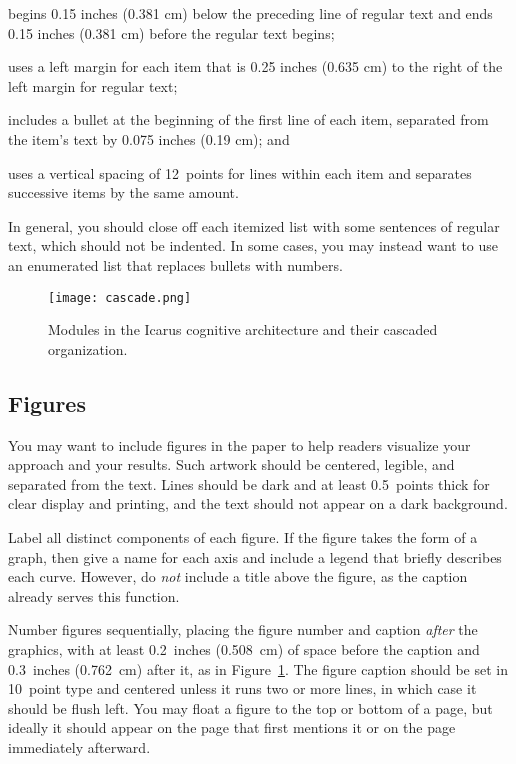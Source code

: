 \documentclass[11pt,letterpaper]{article}
\begin{document}
\cbullet 
begins 0.15 inches (0.381 cm) below the preceding line of regular text 
and ends 0.15 inches (0.381 cm) before the regular text begins; 

\cbullet 
uses a left margin for each item that is 0.25 inches (0.635 cm) to the 
right of the left margin for regular text; 

\cbullet 
includes a bullet at the beginning of the first line of each item,
separated from the item's text by 0.075 inches (0.19 cm); and

\cbullet 
uses a vertical spacing of 12~points for lines within each item 
and separates successive items by the same amount. 

\vskip 0.05in
\noindent
In general, you should close off each itemized list with some sentences 
of regular text, which should not be indented. In some cases, you may
instead want to use an enumerated list that replaces bullets with numbers. 

\begin{figure}[t]
\vskip 0.05in
\begin{center}
\texttt{[image: cascade.png]}
\caption{Modules in the {\sc Icarus} cognitive architecture and their
         cascaded organization.} 
\label{sample-figure}
\end{center}
\vskip -0.2in
\end{figure} 

\subsection{Figures}
 
You may want to include figures in the paper to help readers visualize
your approach and your results. Such artwork should be centered,
legible, and separated from the text. Lines should be dark and at
least 0.5~points thick for clear display and printing, and the text 
should not appear on a dark background.



Label all distinct components of each figure. If the figure takes
the form of a graph, then give a name for each axis and include a 
legend that briefly describes each curve. However, do {\it not\/} 
include a title above the figure, as the caption already serves
this function. 

Number figures sequentially, placing the figure number and caption
{\it after\/} the graphics, with at least 0.2~inches (0.508~cm) of 
space before the caption and 0.3~inches (0.762~cm) after it, as in
Figure~\ref{sample-figure}. The figure caption should be set in
10~point type and centered unless it runs two or more lines, in which
case it should be flush left. You may float a figure to the top or
bottom of a page, but ideally it should appear on the page that
first mentions it or on the page immediately afterward. 
 
\end{document}
